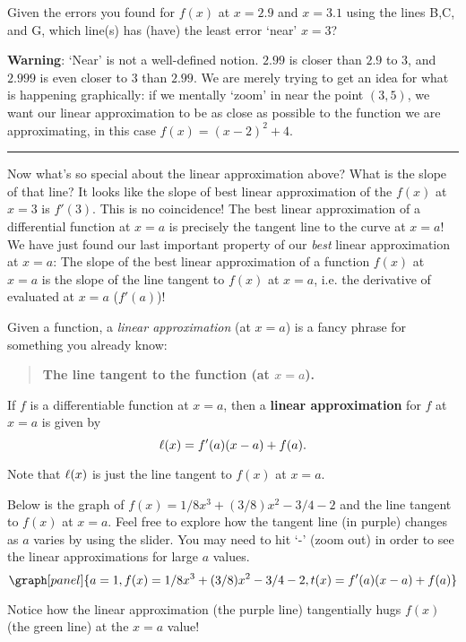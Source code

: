 \documentclass[handout,nooutcomes]{ximera}
\begin{document}
\begin{question}
Given the errors you found for $f(x)$ at $x=2.9$ and $x=3.1$ using the lines B,C, and G, which line(s) has (have) the least error `near' $x=3$?
\begin{selectAll}
\end{selectAll}
\end{question}

\textbf{Warning}: `Near' is not a well-defined notion. $2.99$ is closer than $2.9$
to $3$, and
$2.999$ is even closer to $3$ than $2.99$. We are merely trying to get 
an idea for what is happening graphically: if we mentally `zoom' in 
near the point $(3,5)$, we want our linear approximation to
be as close as possible to the function we are approximating, in this case $f(x) = (x-2)^2 + 4$.\\
\hrule
\medskip

Now what's so special about the linear approximation above? 
What is the slope of that line? It looks like the slope of best linear
approximation of the $f(x)$ at $x=3$ is $f'(3)$. This is no coincidence! 
The best linear approximation of a differential function at $x=a$
is precisely the tangent line to the curve at $x=a$! We have just found our last important property of our \textit{best} linear approximation at $x=a$: The slope of the best linear approximation of a function $f(x)$ at $x=a$ is the slope of the line tangent to $f(x)$ at $x=a$, i.e. the derivative of evaluated at $x=a$ ($f'(a)$)!\\
\medskip


Given a function, a \textit{linear approximation} (at $x=a$) is a fancy phrase
for something you already know:
\begin{center}
\begin{quote}
  \textbf{The line tangent to the function (at $x=a$).}
\end{quote}
\end{center}


\begin{definition}
If $f$ is a differentiable function at $x=a$, then a \textbf{linear
  approximation} for $f$ at $x=a$ is given by
\[
\ell(x) = f'(a)(x-a) +f(a).\\
\]
\end{definition}






Note that $\ell(x)$ is just the line tangent to $f(x)$ at $x=a$.


\begin{example}
Below is the graph of $f(x) = 1/8x^3 + (3/8)x^2 -3/4 - 2$ and the line
tangent to $f(x)$ at $x=a$. Feel free to explore how the tangent line
(in purple) changes as $a$ varies by using the slider. You may need to
hit `-' (zoom out) in order to see the linear approximations for large $a$ values.
\[
\graph[panel]{a=1, f(x) = 1/8x^3 + (3/8)x^2 -3/4 - 2, t(x) = f'(a)(x-a)+ f(a)}
\]

Notice how the linear approximation (the purple line) tangentially hugs
$f(x)$ (the green line) at the $x=a$ value!
\end{example}
\end{document}
